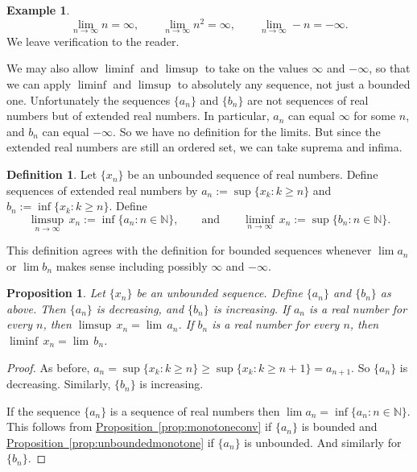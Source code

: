 \documentclass[12pt]{book}
\newcommand{\N}{{\mathbb{N}}}
\theoremstyle{plain}
\newtheorem{prop}[thm]{Proposition}
\theoremstyle{remark}
\theoremstyle{definition}
\newtheorem{defn}[thm]{Definition}
\theoremstyle{exercise}
\theoremstyle{example}
\newtheorem{example}[thm]{Example}
\newcommand{\propref}[1]{\hyperref[#1]{Proposition~\ref*{#1}}}
\begin{document}
\begin{example}
\begin{equation*}
\lim_{n\to \infty} n = \infty,
\qquad 
\lim_{n\to \infty} n^2 = \infty,
\qquad 
\lim_{n\to \infty} -n = -\infty.
\end{equation*}
We leave verification to the reader.
\end{example}

We may also allow $\liminf$ and $\limsup$ to take on
the values $\infty$ and $-\infty$, so that
we can apply $\liminf$ and $\limsup$
to absolutely any sequence, not just
a bounded one.   Unfortunately the sequences $\{ a_n \}$ and $\{ b_n \}$
are not sequences of real numbers but of extended real numbers.  In
particular, $a_n$ can equal $\infty$ for some $n$, and $b_n$ can equal
$-\infty$.  So we have no definition for the limits.
But since the extended real numbers are still an ordered set, we
can take suprema and infima.

\begin{defn}
Let $\{ x_n \}$ be an unbounded sequence of real numbers.  Define 
sequences of extended real numbers by
$a_n := \sup \{ x_k : k \geq n \}$ and
$b_n := \inf \{ x_k : k \geq n \}$.  Define
\begin{equation*}
\limsup_{n \to \infty} \, x_n := \inf \{ a_n : n \in \N \}, \qquad \text{and} \qquad
\liminf_{n \to \infty} \, x_n := \sup \{ b_n : n \in \N \}.
\end{equation*}
\end{defn}

This definition agrees with the definition for bounded
sequences whenever $\lim a_n$ or $\lim b_n$ makes sense including
possibly $\infty$ and $-\infty$.

\begin{prop}
Let $\{ x_n \}$ be an unbounded sequence.  Define 
$\{ a_n \}$ and $\{ b_n \}$ as above.
Then $\{ a_n \}$ is decreasing, and $\{ b_n \}$ is increasing.
If $a_n$ is a real number for every $n$, then
$\limsup \, x_n = \lim \, a_n$. 
If $b_n$ is a real number for every $n$, then
$\liminf \, x_n = \lim \, b_n$.
\end{prop}

\begin{proof}
As before,
$a_n = \sup \{ x_k : k \geq n \} \geq \sup \{ x_k : k \geq n+1 \} =
a_{n+1}$.  So $\{ a_n \}$ is decreasing. Similarly, $\{ b_n \}$ is increasing.

If the sequence $\{ a_n \}$ is a sequence of real numbers then
$\lim a_n = \inf \{ a_n : n \in \N \}$.  This follows from
\propref{prop:monotoneconv} if $\{ a_n \}$ is bounded and \propref{prop:unboundedmonotone} if $\{a_n \}$
is unbounded.  And similarly for $\{ b_n \}$.
\end{proof}
\end{document}
